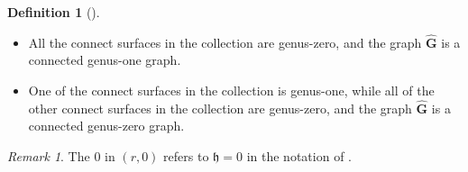 \documentclass[11pt]{amsart}
\theoremstyle{definition}
\newtheorem{dfn}[dummy]{Definition}
\theoremstyle{remark}
\newtheorem{rmk}[dummy]{Remark}
\newcommand{\<}{\left<}
\renewcommand{\>}{\right>}
\numberwithin{equation}{section}
\def\h{{\mathfrak h}}
\begin{document}
\begin{dfn}[{\cite[Definition 4.3]{TZ1}}]
\begin{itemize}
        \begin{itemize}
            \item All the connect surfaces in the collection are genus-zero, and the graph $\hat{\mathbf{G}}$ is a connected genus-one graph.
            \item One of the connect surfaces in the collection %
is genus-one, while %
all of the other connect surfaces in the collection are genus-zero, and the graph $\hat{\mathbf{G}}$ is a connected genus-zero graph.
        \end{itemize}
    \end{itemize}
   
    
\end{dfn}

\begin{rmk}
    The $0$ in $(r,0)$ refers to $\h=0$ in the notation of \cite{TZ1,TZ2}.
\end{rmk}
\end{document}
